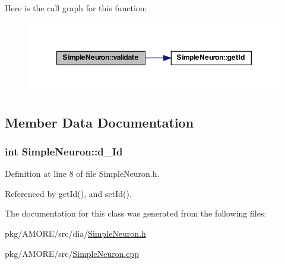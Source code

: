 Here is the call graph for this function:\nopagebreak
\begin{figure}[H]
\begin{center}
\leavevmode
\includegraphics[width=354pt]{class_simple_neuron_a9e7173abb892281d0b2ffb0efc82f0e5_cgraph}
\end{center}
\end{figure}




\subsection{Member Data Documentation}
\hypertarget{class_simple_neuron_ad87b0b67c7f8bfe5377313c1e3fac60c}{
\subsubsection[{d\_\-Id}]{\setlength{\rightskip}{0pt plus 5cm}int {\bf SimpleNeuron::d\_\-Id}}}
\label{class_simple_neuron_ad87b0b67c7f8bfe5377313c1e3fac60c}


Definition at line 8 of file SimpleNeuron.h.



Referenced by getId(), and setId().



The documentation for this class was generated from the following files:\begin{DoxyCompactItemize}
\item 
pkg/AMORE/src/dia/\hyperlink{_simple_neuron_8h}{SimpleNeuron.h}\item 
pkg/AMORE/src/\hyperlink{_simple_neuron_8cpp}{SimpleNeuron.cpp}\end{DoxyCompactItemize}
